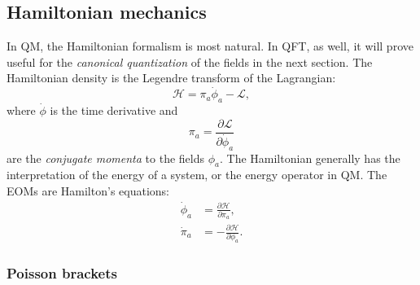\subsection{Hamiltonian mechanics}

In QM, the Hamiltonian formalism is most natural.
In QFT, as well, it will prove useful for the \textit{canonical quantization} of the fields in the next section.
The Hamiltonian density is the Legendre transform of the Lagrangian:
\begin{equation}
	\label{eq:01_qft_hamiltonian}
	\mathcal H = \pi_a\dot\phi_a - \mathcal{L},
\end{equation}
where $\dot\phi$ is the time derivative and
\begin{equation}
	\label{eq:01_qft_hamiltonian_momenta}
	\pi_a = \frac{\partial\mathcal L}{\partial\dot\phi_a}
\end{equation}
are the \textit{conjugate momenta} to the fields $\phi_a$.
The Hamiltonian generally has the interpretation of the energy of a system, or the energy operator in QM.
The EOMs are Hamilton's equations:
\begin{equation}
	\label{eq:01_qft_hamiltonian_eoms}
	\begin{split}
		\dot\phi_a &= \frac{\partial\mathcal H}{\partial\pi_a}, \\
		\dot\pi_a &= -\frac{\partial\mathcal H}{\partial\phi_a}.
	\end{split}
\end{equation}

\subsubsection{Poisson brackets}

